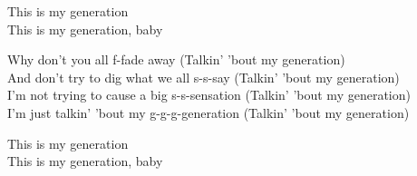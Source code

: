 \documentclass[landscape,final,a0paper,fontscale=0.27]{baposter}
\begin{document}
\begin{poster}
{\begin{multicols}{2}
This is my generation\\
This is my generation, baby\\
\bigskip

Why don't you all f-fade away (Talkin' 'bout my generation)\\
And don't try to dig what we all s-s-say (Talkin' 'bout my generation)\\
I'm not trying to cause a big s-s-sensation (Talkin' 'bout my generation)\\
I'm just talkin' 'bout my g-g-g-generation (Talkin' 'bout my generation)\\
\bigskip

This is my generation\\
This is my generation, baby\\

\end{multicols}
}





\end{poster}
\end{document}
